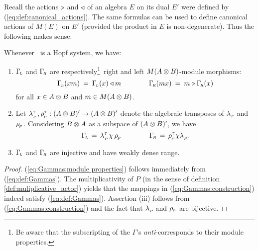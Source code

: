 Recall the actions $\triangleright$ and $\triangleleft$ of an algebra $E$ on its dual $E'$
were defined by (\ref{eq:def:canonical_actions}).
The same formulas can be used to define canonical actions of $M(E)$ on $E'$
(provided the product in $E$ is non-degenerate).
Thus the following makes sense:

\begin{lemma_sec}
Whenever\/ \pairAB\ is a Hopf system, we have:
\begin{enumerate}
\item
  $\Gamma_{\!\scriptscriptstyle L}$ and\/ $\Gamma_{\!\scriptscriptstyle R}$ are respectively\footnote{Be aware that the subscripting
  of the $\Gamma$'s {\em anti\/}-corresponds to their module properties.}\
  right and left\/ $M(A\otimes B)$-module morphisms:
  \begin{equation}\label{eq:Gammas:module properties}
    \Gamma_{\!\scriptscriptstyle L}(xm) \:=\: \Gamma_{\!\scriptscriptstyle L}(x) \triangleleft m    \hspace{4em}    \Gamma_{\!\scriptscriptstyle R}(mx) \:=\: m \triangleright \Gamma_{\!\scriptscriptstyle R}(x)
  \end{equation}
  for all\/ $x \in A\otimes B$ and\/ $m \in M(A\otimes B)$.
\item
  Let $\lambda_{_P\!}^\tau\, , \rho_{_{\!P}}^\tau : (A \otimes B)' \rightarrow (A \otimes B)'$ denote the algebraic
  transposes of $\lambda_{_P\!}$ and $\rho_{_{\!P}}$. Considering $B \otimes A$ as a subspace of $(A \otimes B)'$,
  we have
  \begin{equation}\label{eq:Gammas:construction}
    \Gamma_{\!\scriptscriptstyle L} \,=\, \lambda_{_P\!}^\tau \, \chi \, \rho_{_{\!P}}     \hspace{4em}
    \Gamma_{\!\scriptscriptstyle R} \,=\, \rho_{_{\!P}}^\tau \chi \lambda_{_P\!}.
  \end{equation}
\item
  $\Gamma_{\!\scriptscriptstyle L}$ and\/ $\Gamma_{\!\scriptscriptstyle R}$ are injective and have weakly dense range.
\end{enumerate}
\end{lemma_sec}

\begin{proof}
(\ref{eq:Gammas:module properties}) follows immediately from (\ref{eq:def:Gammas}).
The multiplicativity of $P$ (in the sense of definition \ref{def:muliplicative_actor})
yields that the mappings in (\ref{eq:Gammas:construction}) indeed satisfy (\ref{eq:def:Gammas}).
Assertion (iii) follows from (\ref{eq:Gammas:construction}) and the fact that
$\lambda_{_P\!}$ and $\rho_{_{\!P}}$ are bijective.
\end{proof}


